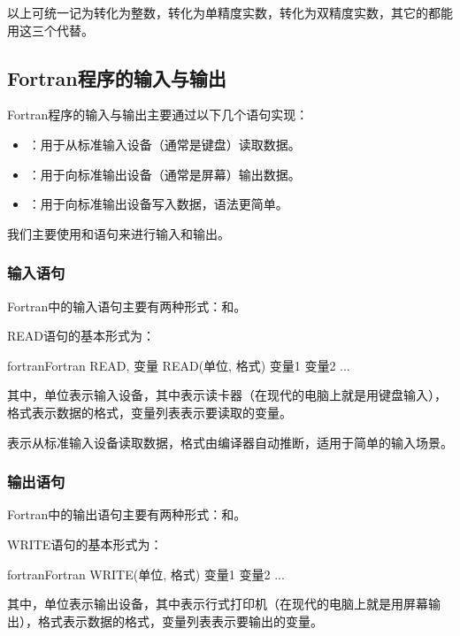 以上可统一记为转化为整数，转化为单精度实数，转化为双精度实数，其它的都能用这三个代替。

\subsection{Fortran程序的输入与输出}

Fortran程序的输入与输出主要通过以下几个语句实现：

\begin{itemize}
    \item {}：用于从标准输入设备（通常是键盘）读取数据。
    \item {}：用于向标准输出设备（通常是屏幕）输出数据。
    \item {}：用于向标准输出设备写入数据，语法更简单。
\end{itemize}

我们主要使用和语句来进行输入和输出。

\subsubsection{输入语句}

Fortran中的输入语句主要有两种形式：和。

READ语句的基本形式为：
\begin{envcode}{fortran}{Fortran}
      READ, 变量
      READ(单位, 格式) 变量1 变量2 ...
\end{envcode}

其中，单位表示输入设备，其中表示读卡器（在现代的电脑上就是用键盘输入），格式表示数据的格式，变量列表表示要读取的变量。

表示从标准输入设备读取数据，格式由编译器自动推断，适用于简单的输入场景。

\subsubsection{输出语句}

Fortran中的输出语句主要有两种形式：和。


WRITE语句的基本形式为：
\begin{envcode}{fortran}{Fortran}
      WRITE(单位, 格式) 变量1 变量2 ...
\end{envcode}
其中，单位表示输出设备，其中表示行式打印机（在现代的电脑上就是用屏幕输出），格式表示数据的格式，变量列表表示要输出的变量。

